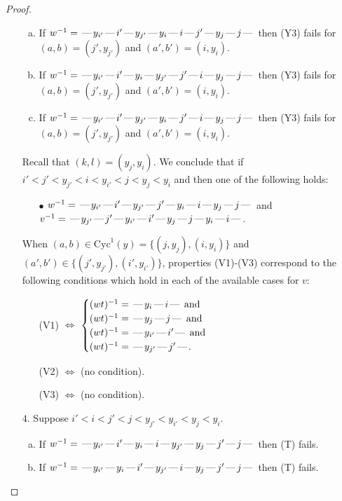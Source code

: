 \documentclass[10pt]{article}
\theoremstyle{definition}
\theoremstyle{definition}
\def\dash{\text{\hspace{0.5mm}---\hspace{0.5mm}}}
\def\Cyc{\mathrm{Cyc}}
\begin{document}
\begin{proof}
\begin{enumerate}
\begin{enumerate}[(a)]
\item If $w^{-1} = \dash y_{i'}\dash i'\dash y_{j'}\dash y_i\dash i\dash j'\dash y_j\dash j\dash $ then (Y3) fails for $(a,b)=(j',y_{j'})$ and $(a',b')=(i,y_i)$.
\item If $w^{-1} = \dash y_{i'}\dash i'\dash y_i\dash y_{j'}\dash j'\dash i\dash y_j\dash j\dash $ then (Y3) fails for $(a,b)=(j',y_{j'})$ and $(a',b')=(i,y_i)$.
\item If $w^{-1} = \dash y_{i'}\dash i'\dash y_{j'}\dash y_i\dash j'\dash i\dash y_j\dash j\dash $ then (Y3) fails for $(a,b)=(j',y_{j'})$ and $(a',b')=(i,y_i)$.
\end{enumerate}
Recall that $(k,l) = (y_j,y_i)$.
We conclude that if $i' < j' < y_{j'} < i < y_{i'} < j < y_j < y_i$ and then one of the following holds:
\begin{enumerate}
\item[$\bullet$] $w^{-1} = \dash y_{i'}\dash i'\dash y_{j'}\dash j'\dash y_i\dash i\dash y_j\dash j\dash $ and $v^{-1} = \dash y_{j'}\dash j'\dash y_{i'}\dash i'\dash y_j\dash j\dash y_i\dash i\dash $.
\end{enumerate}
When $(a,b)\in\Cyc^1(y)=\{(j,y_j),(i,y_i)\}$ and $(a',b')\in\{(j',y_{j'}),(i',y_{i'})\}$,
properties (V1)-(V3) correspond to the following conditions which hold in
each of the available cases for $v$:
\begin{enumerate}
\item[](V1) $\Leftrightarrow$ $\begin{cases}\text{$(wt)^{-1} = \dash y_i \dash i \dash$}\text{ and }\\
\text{$(wt)^{-1} = \dash y_j \dash j \dash$}\text{ and }\\
\text{$(wt)^{-1} = \dash y_{i'} \dash i' \dash$}\text{ and }\\
\text{$(wt)^{-1} = \dash y_{j'} \dash j' \dash$}.\end{cases}$
\item[](V2) $\Leftrightarrow$ (no condition).
\item[](V3) $\Leftrightarrow$ (no condition).
\end{enumerate}
\item[$4$.] Suppose $i' < i < j' < j < y_{j'} < y_{i'} < y_j < y_i$.
\begin{enumerate}[(a)]
\item If $w^{-1} = \dash y_{i'}\dash i'\dash y_i\dash i\dash y_{j'}\dash y_j\dash j'\dash j\dash $ then (T) fails.
\item If $w^{-1} = \dash y_{i'}\dash y_i\dash i'\dash y_{j'}\dash i\dash y_j\dash j'\dash j\dash $ then (T) fails.

\end{enumerate}
\end{enumerate}
\end{proof}
\end{document}
